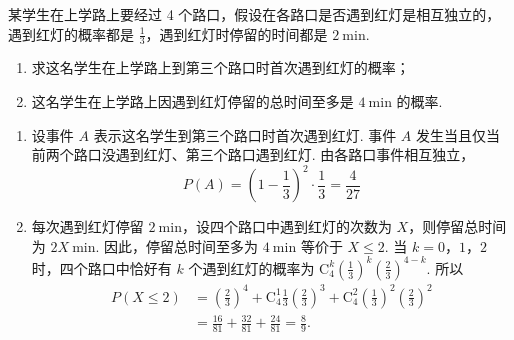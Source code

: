\begin{problem}
某学生在上学路上要经过 4 个路口，假设在各路口是否遇到红灯是相互独立的，遇到红灯的概率都是 \(\frac{1}{3}\)，遇到红灯时停留的时间都是 \(2 \mathrm{~min}\).
\begin{enumerate}
\item 求这名学生在上学路上到第三个路口时首次遇到红灯的概率；
\item 这名学生在上学路上因遇到红灯停留的总时间至多是 \(4 \mathrm{~min}\) 的概率.
\end{enumerate}

\begin{solution}
\begin{enumerate}
\item 设事件 \(A\) 表示这名学生到第三个路口时首次遇到红灯.
事件 \(A\) 发生当且仅当前两个路口没遇到红灯、第三个路口遇到红灯.
由各路口事件相互独立，
\[
P(A)=\left(1-\frac{1}{3}\right)^2\cdot\frac{1}{3}=\frac{4}{27}
\]

\item 每次遇到红灯停留 \(2\mathrm{~min}\)，设四个路口中遇到红灯的次数为 \(X\)，则停留总时间为 \(2X\mathrm{~min}\).
因此，停留总时间至多为 \(4\mathrm{~min}\) 等价于 \(X\leqslant 2\).
当 \(k=0\)，\(1\)，\(2\) 时，四个路口中恰好有 \(k\) 个遇到红灯的概率为
\(\mathrm C_4^k\left(\frac{1}{3}\right)^k\left(\frac{2}{3}\right)^{4-k}\).
所以
\[
\begin{aligned}
P(X\leqslant 2)
&=\left(\frac{2}{3}\right)^4+\mathrm C_4^1\frac{1}{3}\left(\frac{2}{3}\right)^3+\mathrm C_4^2\left(\frac{1}{3}\right)^2\left(\frac{2}{3}\right)^2\\
&=\frac{16}{81}+\frac{32}{81}+\frac{24}{81}=\frac{8}{9}.
\end{aligned}
\]
\end{enumerate}
\end{solution}
\end{problem}

